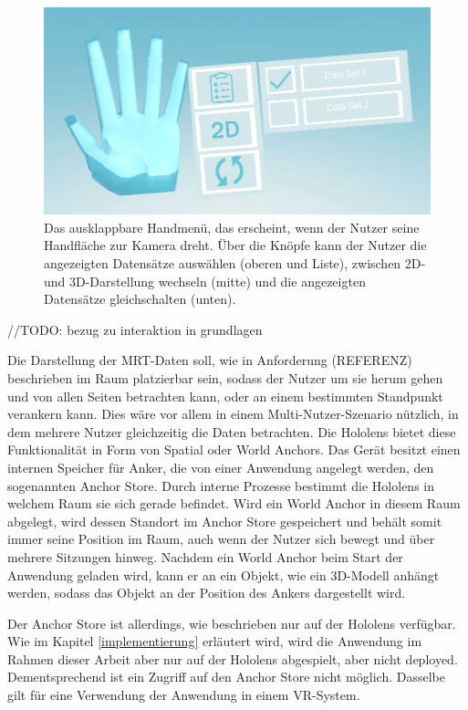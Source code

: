 \begin{figure}
	\centering
	\includegraphics[width=0.7\linewidth]{images/handUI.png}
	\caption{Das ausklappbare Handmenü, das erscheint, wenn der Nutzer seine Handfläche zur Kamera dreht. Über die Knöpfe kann der Nutzer die angezeigten Datensätze auswählen (oberen und Liste), zwischen 2D- und 3D-Darstellung wechseln (mitte) und die angezeigten Datensätze gleichschalten (unten). }
	\label{img:handUI}
\end{figure}

//TODO:
bezug zu interaktion in grundlagen

Die Darstellung der MRT-Daten soll, wie in Anforderung (REFERENZ) beschrieben im Raum platzierbar sein, sodass der Nutzer um sie herum gehen und von allen Seiten betrachten kann, oder an einem bestimmten Standpunkt verankern kann. Dies wäre vor allem in einem Multi-Nutzer-Szenario nützlich, in dem mehrere Nutzer gleichzeitig die Daten betrachten.
Die Hololens bietet diese Funktionalität in Form von Spatial oder World Anchors. Das Gerät besitzt einen internen Speicher für Anker, die von einer Anwendung angelegt werden, den sogenannten Anchor Store. Durch interne Prozesse bestimmt die Hololens in welchem Raum sie sich gerade befindet. Wird ein World Anchor in diesem Raum abgelegt, wird dessen Standort im Anchor Store gespeichert und behält somit immer seine Position im Raum, auch wenn der Nutzer sich bewegt und über mehrere Sitzungen hinweg. Nachdem ein World Anchor beim Start der Anwendung geladen wird, kann er an ein Objekt, wie ein 3D-Modell anhängt werden, sodass das Objekt an der Position des Ankers dargestellt wird. 

Der Anchor Store ist allerdings, wie beschrieben nur auf der Hololens verfügbar. Wie im Kapitel \ref{implementierung} erläutert wird, wird die Anwendung im Rahmen dieser Arbeit aber nur auf der Hololens abgespielt, aber nicht deployed. Dementsprechend ist ein Zugriff auf den Anchor Store nicht möglich. Dasselbe gilt für eine Verwendung der Anwendung in einem VR-System.

